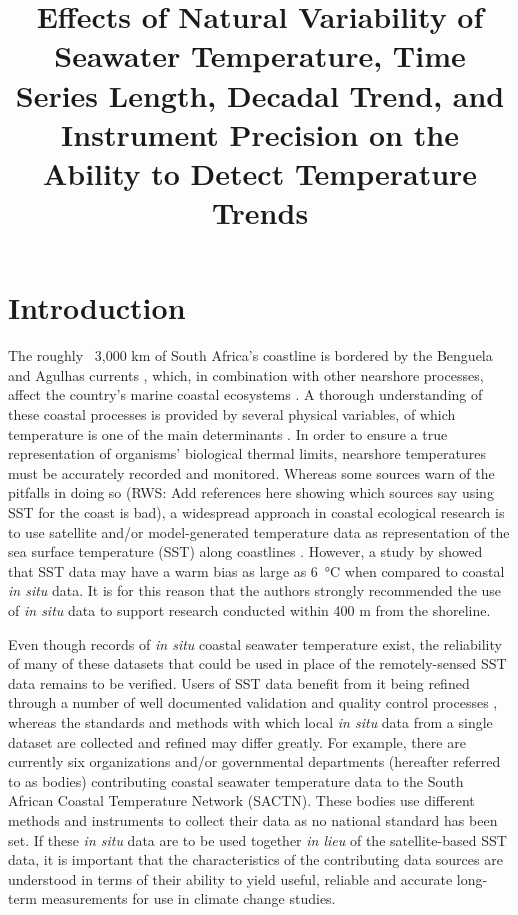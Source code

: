 \documentclass{ametsoc}
\title{Effects of Natural Variability of Seawater Temperature, Time Series Length, Decadal Trend, and Instrument Precision on the Ability to Detect Temperature Trends}
\affiliation{Department of Biodiversity and Conservation Biology, University of the Western Cape, Bellville, Republic of South Africa}
\begin{document}
\maketitle

\section{Introduction}
The roughly ~3,000 km of South Africa's coastline is bordered by the Benguela and Agulhas currents \citep[e.g.][]{Roberts2005,Hutchings2009}, which, in combination with other nearshore processes, affect the country's marine coastal ecosystems \citep{Santos2012a}. A thorough understanding of these coastal processes is provided by several physical variables, of which temperature is one of the main determinants \citep[e.g.][]{Blanchette2008, Tittensor2010, Couce2012}. In order to ensure a true representation of organisms' biological thermal limits, nearshore temperatures must be accurately recorded and monitored. Whereas some sources warn of the pitfalls in doing so (RWS: Add references here showing which sources say using SST for the coast is bad), a widespread approach in coastal ecological research is to use satellite and/or model-generated temperature data as representation of the sea surface temperature (SST) along coastlines \citep[e.g.][]{Blanchette2008, Broitman2008a, Tyberghein2012}. However, a study by \citet{Smit2013} showed that SST data may have a warm bias as large as \SI{6}{\degreeCelsius} when compared to coastal \emph{in situ} data. It is for this reason that the authors strongly recommended the use of \emph{in situ} data to support research conducted within 400 m from the shoreline.

Even though records of \emph{in situ} coastal seawater temperature exist, the reliability of many of these datasets that could be used in place of the remotely-sensed SST data remains to be verified. Users of SST data benefit from it being refined through a number of well documented validation and quality control processes \citep[e.g.][]{Reynolds1994, Brown1999, Martin2012}, whereas the standards and methods with which local \emph{in situ} data from a single dataset are collected and refined may differ greatly. For example, there are currently six organizations and/or governmental departments (hereafter referred to as bodies) contributing coastal seawater temperature data to the South African Coastal Temperature Network (SACTN). These bodies use different methods and instruments to collect their data as no national standard has been set. If these \emph{in situ} data are to be used together \emph{in lieu} of the satellite-based SST data, it is important that the characteristics of the contributing data sources are understood in terms of their ability to yield useful, reliable and accurate long-term measurements for use in climate change studies.
\end{document}
